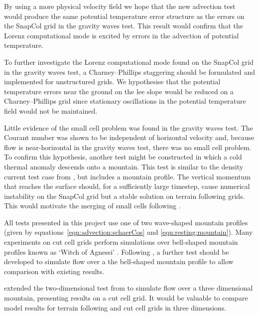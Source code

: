 By using a more physical velocity field we hope that the new advection test would produce the same potential temperature error structure as the errors on the SnapCol grid in the gravity waves test.  This result would confirm that the Lorenz computational mode is excited by errors in the advection of potential temperature.

To further investigate the Lorenz computational mode found on the SnapCol grid in the gravity waves test, a Charney--Phillips staggering should be formulated and implemented for unstructured grids.  We hypothesise that the potential temperature errors near the ground on the lee slope would be reduced on a Charney--Phillips grid since stationary oscillations in the potential temperature field would not be maintained.

Little evidence of the small cell problem was found in the gravity waves test.  The Courant number was shown to be independent of horizontal velocity and, because flow is near-horizontal in the gravity waves test, there was no small cell problem.  To confirm this hypothesis, another test might be constructed in which a cold thermal anomaly descends onto a mountain.  This test is similar to the density current test case from \textcite{straka1993}, but includes a mountain profile.  The vertical momentum that reaches the surface should, for a sufficiently large timestep, cause numerical instability on the SnapCol grid but a stable solution on terrain following grids.  This would motivate the merging of small cells following \textcite{yamazaki-satomura2010}.

All tests presented in this project use one of two wave-shaped mountain profiles (given by equations~\ref{eqn:advection:schaerCos} and \ref{eqn:resting:mountain}).  Many experiments on cut cell grids perform simulations over bell-shaped mountain profiles known as `Witch of Agnessi' \parencites{steppeler2002}{rosatti2005}{klein2009}{jebens2011}.  Following \textcite{gallus-klemp2000}, a further test should be developed to simulate flow over a the bell-shaped mountain profile to allow comparison with existing results.

\textcite{lock2012} extended the two-dimensional test from \textcite{gallus-klemp2000} to simulate flow over a three dimensional mountain, presenting results on a cut cell grid.  It would be valuable to compare model results for terrain following and cut cell grids in three dimensions.

